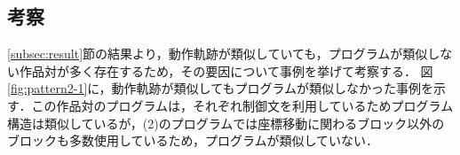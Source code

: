 \documentclass[T,J]{fose} %
\newcommand{\todo}[1]{\colorbox{yellow}{{\bf TODO}:}{\color{red} {\textbf{[#1]}}}}
\begin{document}







\vspace{-10pt}
\subsection{考察}
\ref{subsec:result}節の結果より，動作軌跡が類似していても，プログラムが類似しない作品対が多く存在するため，その要因について事例を挙げて考察する．
図\ref{fig:pattern2-1}に，動作軌跡が類似してもプログラムが類似しなかった事例を示す．この作品対のプログラムは，それぞれ制御文を利用しているためプログラム構造は類似しているが，(2)のプログラムでは座標移動に関わるブロック以外のブロックも多数使用しているため，プログラムが類似していない．
\end{document}
